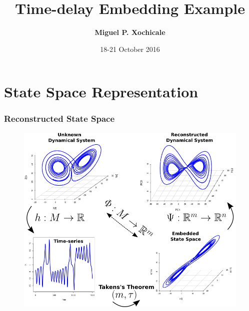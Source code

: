 \documentclass{beamer}
\title[Time-delay Embedding Example]
{Time-delay Embedding Example}
\author[Miguel P. Xochicale]
{   %
    \textbf{Miguel P. Xochicale }
}
\institute[CVC-IIIA]
{   %

      \vspace{5mm}
    \begin{tabular}{c}
    \end{tabular}
}
\date[DEMO-2013]
{   %
          18-21 October 2016
}
\begin{document}
\frame{\titlepage}


\section{State Space Representation}


\begin{frame}
\frametitle{Reconstructed State Space}
\vspace{-5mm}

\begin{figure}
\centering 
\includegraphics[scale=.35]{takens_theorem_v5} 
\end{figure}

\end{frame}
\end{document}
